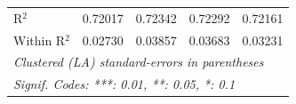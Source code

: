 \begin{table}[htbp]
\begin{tabular}{lcccc}
      R$^2$                         & 0.72017        & 0.72342        & 0.72292        & 0.72161\\  
      Within R$^2$                  & 0.02730        & 0.03857        & 0.03683        & 0.03231\\  
      \midrule \midrule
      \multicolumn{5}{l}{\emph{Clustered (LA) standard-errors in parentheses}}\\
      \multicolumn{5}{l}{\emph{Signif. Codes: ***: 0.01, **: 0.05, *: 0.1}}\\
   \end{tabular}
\end{table}


